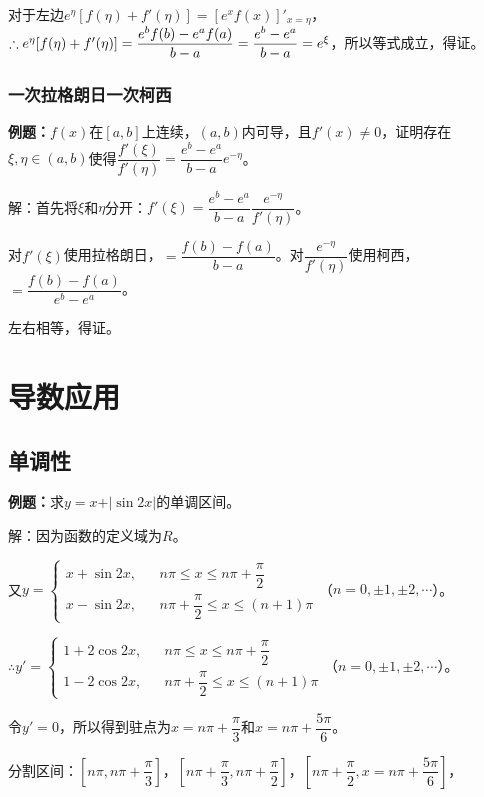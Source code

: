 对于左边$e^\eta[f(\eta)+f'(\eta)]=[e^xf(x)]'_{x=\eta}$，$\therefore e^\eta[f(\eta)+f'(\eta)]=\dfrac{e^bf(b)-e^af(a)}{b-a}\\=\dfrac{e^b-e^a}{b-a}=e^\xi$，所以等式成立，得证。

\subsubsection{一次拉格朗日一次柯西}

\textbf{例题：}$f(x)$在$[a,b]$上连续，$(a,b)$内可导，且$f'(x)\neq0$，证明存在$\xi,\eta\in(a,b)$使得$\dfrac{f'(\xi)}{f'(\eta)}=\dfrac{e^b-e^a}{b-a}e^{-\eta}$。

解：首先将$\xi$和$\eta$分开：$f'(\xi)=\dfrac{e^b-e^a}{b-a}\dfrac{e^{-\eta}}{f'(\eta)}$。

对$f'(\xi)$使用拉格朗日，$=\dfrac{f(b)-f(a)}{b-a}$。对$\dfrac{e^{-\eta}}{f'(\eta)}$使用柯西，$=\dfrac{f(b)-f(a)}{e^b-e^a}$。

左右相等，得证。

\section{导数应用}

\subsection{单调性}

\textbf{例题：}求$y=x+\vert\sin 2x\vert$的单调区间。

解：因为函数的定义域为$R$。

又$y=\left\{\begin{array}{lcl}
    x+\sin 2x, & & n\pi\leqslant x\leqslant n\pi+\dfrac{\pi}{2} \\
    x-\sin 2x, & &n\pi+\dfrac{\pi}{2}\leqslant x\leqslant (n+1)\pi
\end{array}\right.$（$n=0,\pm 1,\pm2,\cdots$）。

$\therefore y'=\left\{\begin{array}{lcl}
    1+2\cos 2x, & & n\pi\leqslant x\leqslant n\pi+\dfrac{\pi}{2} \\
    1-2\cos 2x, & &n\pi+\dfrac{\pi}{2}\leqslant x\leqslant (n+1)\pi
\end{array}\right.$（$n=0,\pm 1,\pm2,\cdots$）。

令$y'=0$，所以得到驻点为$x=n\pi+\dfrac{\pi}{3}$和$x=n\pi+\dfrac{5\pi}{6}$。

分割区间：$\left[n\pi,n\pi+\dfrac{\pi}{3}\right]$，$\left[n\pi+\dfrac{\pi}{3},n\pi+\dfrac{\pi}{2}\right]$，$\left[n\pi+\dfrac{\pi}{2},x=n\pi+\dfrac{5\pi}{6}\right]$，

